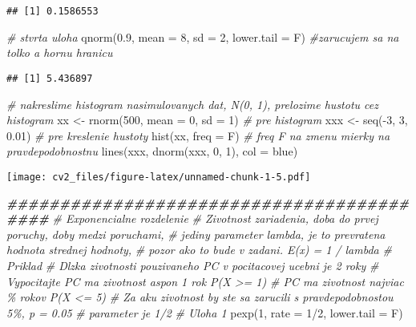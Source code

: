 \documentclass[
]{article}
\newenvironment{Shaded}{\begin{snugshade}}{\end{snugshade}}
\newcommand{\AttributeTok}[1]{\textcolor[rgb]{0.77,0.63,0.00}{#1}}
\newcommand{\CommentTok}[1]{\textcolor[rgb]{0.56,0.35,0.01}{\textit{#1}}}
\newcommand{\DecValTok}[1]{\textcolor[rgb]{0.00,0.00,0.81}{#1}}
\newcommand{\DocumentationTok}[1]{\textcolor[rgb]{0.56,0.35,0.01}{\textbf{\textit{#1}}}}
\newcommand{\FloatTok}[1]{\textcolor[rgb]{0.00,0.00,0.81}{#1}}
\newcommand{\FunctionTok}[1]{\textcolor[rgb]{0.00,0.00,0.00}{#1}}
\newcommand{\NormalTok}[1]{#1}
\newcommand{\OtherTok}[1]{\textcolor[rgb]{0.56,0.35,0.01}{#1}}
\newcommand{\SpecialCharTok}[1]{\textcolor[rgb]{0.00,0.00,0.00}{#1}}
\newcommand{\StringTok}[1]{\textcolor[rgb]{0.31,0.60,0.02}{#1}}
\begin{document}
\begin{verbatim}
## [1] 0.1586553
\end{verbatim}

\begin{Shaded}
\begin{Highlighting}[]
\CommentTok{\# stvrta uloha}
\FunctionTok{qnorm}\NormalTok{(}\FloatTok{0.9}\NormalTok{, }\AttributeTok{mean =} \DecValTok{8}\NormalTok{, }\AttributeTok{sd =} \DecValTok{2}\NormalTok{, }\AttributeTok{lower.tail =}\NormalTok{ F) }\CommentTok{\#zarucujem sa na tolko a hornu hranicu}
\end{Highlighting}
\end{Shaded}

\begin{verbatim}
## [1] 5.436897
\end{verbatim}

\begin{Shaded}
\begin{Highlighting}[]
\CommentTok{\# nakreslime histogram nasimulovanych dat, N(0, 1), prelozime hustotu cez histogram}
\NormalTok{xx }\OtherTok{\textless{}{-}} \FunctionTok{rnorm}\NormalTok{(}\DecValTok{500}\NormalTok{, }\AttributeTok{mean =} \DecValTok{0}\NormalTok{, }\AttributeTok{sd =} \DecValTok{1}\NormalTok{) }\CommentTok{\# pre histogram}
\NormalTok{xxx }\OtherTok{\textless{}{-}} \FunctionTok{seq}\NormalTok{(}\SpecialCharTok{{-}}\DecValTok{3}\NormalTok{, }\DecValTok{3}\NormalTok{, }\FloatTok{0.01}\NormalTok{) }\CommentTok{\# pre kreslenie hustoty}
\FunctionTok{hist}\NormalTok{(xx, }\AttributeTok{freq =}\NormalTok{ F) }\CommentTok{\# freq F na zmenu mierky na pravdepodobnostnu}
\FunctionTok{lines}\NormalTok{(xxx, }\FunctionTok{dnorm}\NormalTok{(xxx, }\DecValTok{0}\NormalTok{, }\DecValTok{1}\NormalTok{), }\AttributeTok{col =} \StringTok{\textquotesingle{}blue\textquotesingle{}}\NormalTok{)}
\end{Highlighting}
\end{Shaded}

\texttt{[image: cv2\_files/figure-latex/unnamed-chunk-1-5.pdf]}

\begin{Shaded}
\begin{Highlighting}[]
\DocumentationTok{\#\#\#\#\#\#\#\#\#\#\#\#\#\#\#\#\#\#\#\#\#\#\#\#\#\#\#\#\#\#\#\#\#\#\#\#\#\#\#\#\#\#}
\CommentTok{\# Exponencialne rozdelenie}
\CommentTok{\# Zivotnost zariadenia, doba do prvej poruchy, doby medzi poruchami,}
\CommentTok{\# jediny parameter lambda, je to prevratena hodnota strednej hodnoty,}
\CommentTok{\# pozor ako to bude v zadani. E(x) = 1 / lambda}
\CommentTok{\# Priklad}
\CommentTok{\# Dlzka zivotnosti pouzivaneho PC v pocitacovej ucebni je 2 roky}
\CommentTok{\# Vypocitajte PC ma zivotnost aspon 1 rok P(X \textgreater{}= 1)}
\CommentTok{\# PC ma zivotnost najviac \% rokov P(X \textless{}= 5)}
\CommentTok{\# Za aku zivotnost by ste sa zarucili s pravdepodobnostou 5\%, p = 0.05}
\CommentTok{\# parameter je 1/2}
\CommentTok{\# Uloha 1}
\FunctionTok{pexp}\NormalTok{(}\DecValTok{1}\NormalTok{, }\AttributeTok{rate =} \DecValTok{1}\SpecialCharTok{/}\DecValTok{2}\NormalTok{, }\AttributeTok{lower.tail =}\NormalTok{ F)}
\end{Highlighting}
\end{Shaded}
\end{document}
